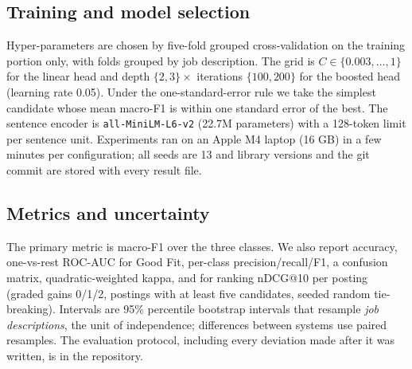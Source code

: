 \subsection{Training and model selection}
Hyper-parameters are chosen by five-fold grouped cross-validation on the training portion only, with
folds grouped by job description. The grid is $C\in\{0.003,\dots,1\}$ for the linear head and depth
$\{2,3\}\times$ iterations $\{100,200\}$ for the boosted head (learning rate 0.05). Under the
one-standard-error rule we take the simplest candidate whose mean macro-F1 is within one standard error of
the best. The sentence encoder is \texttt{all-MiniLM-L6-v2} (22.7M parameters) with a 128-token limit per sentence
unit. Experiments ran on an Apple M4 laptop (16 GB) in a few minutes per configuration; all seeds are 13 and
library versions and the git commit are stored with every result file.

\subsection{Metrics and uncertainty}
The primary metric is macro-F1 over the three classes. We also report accuracy, one-vs-rest ROC-AUC for
Good Fit, per-class precision/recall/F1, a confusion matrix, quadratic-weighted kappa, and for ranking
nDCG@10 per posting (graded gains 0/1/2, postings with at least five candidates, seeded random
tie-breaking). Intervals are 95\% percentile bootstrap intervals that resample \emph{job descriptions},
the unit of independence; differences between systems use paired resamples.
The evaluation protocol, including every deviation made after it was written, is in the repository.
